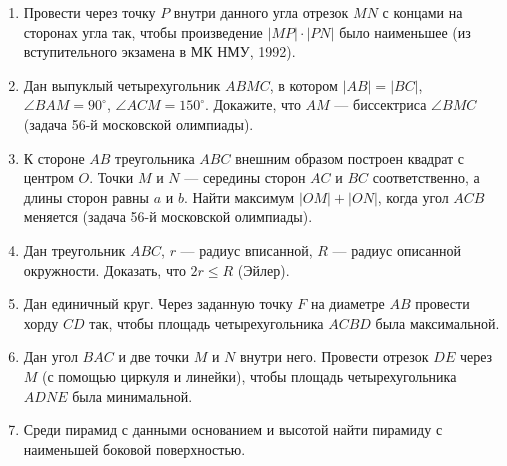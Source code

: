 \begin{enumerate}
		\item Провести через точку $P$ внутри данного угла отрезок $MN$ с концами на сторонах угла так, чтобы произведение $|MP| \cdot |PN|$ было наименьшее (из вступительного экзамена в МК НМУ, 1992).

		\item Дан выпуклый четырехугольник $ABMC$, в котором $|AB| = |BC|$, $\angle BAM = 90^\circ$, $\angle ACM = 150^\circ$. Докажите, что $AM$ — биссектриса $\angle BMC$ (задача 56-й московской олимпиады).

		\item К стороне $AB$ треугольника $ABC$ внешним образом построен квадрат с центром $O$. Точки $M$ и $N$ — середины сторон $AC$ и $BC$ соответственно, а длины сторон равны $a$ и $b$. Найти максимум $|OM| + |ON|$, когда угол $ACB$ меняется (задача 56-й московской олимпиады).

		\item Дан треугольник $ABC$, $r$ — радиус вписанной, $R$ — радиус описанной окружности. Доказать, что $2r \le R$ (Эйлер).

		\item Дан единичный круг. Через заданную точку $F$ на диаметре $AB$ провести хорду $CD$ так, чтобы площадь четырехугольника $ACBD$ была максимальной.

		\item Дан угол $BAC$ и две точки $M$ и $N$ внутри него. Провести отрезок $DE$ через $M$ (с помощью циркуля и линейки), чтобы площадь четырехугольника $ADNE$ была минимальной.

		\item Среди пирамид с данными основанием и высотой найти пирамиду с наименьшей боковой поверхностью.
	\end{enumerate}

